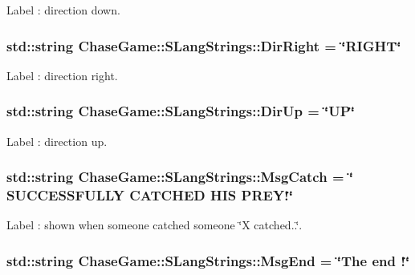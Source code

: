 Label \-: direction down. 

\hypertarget{struct_chase_game_1_1_s_lang_strings_a72eca1e0efc7ab4c6900c4f75322f0dc}{
\subsubsection[{Dir\-Right}]{\setlength{\rightskip}{0pt plus 5cm}std\-::string Chase\-Game\-::\-S\-Lang\-Strings\-::\-Dir\-Right = \char`\"{}R\-I\-G\-H\-T\char`\"{}}}\label{struct_chase_game_1_1_s_lang_strings_a72eca1e0efc7ab4c6900c4f75322f0dc}


Label \-: direction right. 

\hypertarget{struct_chase_game_1_1_s_lang_strings_adf4565dfe8e7ea901505441091d06b0c}{
\subsubsection[{Dir\-Up}]{\setlength{\rightskip}{0pt plus 5cm}std\-::string Chase\-Game\-::\-S\-Lang\-Strings\-::\-Dir\-Up = \char`\"{}U\-P\char`\"{}}}\label{struct_chase_game_1_1_s_lang_strings_adf4565dfe8e7ea901505441091d06b0c}


Label \-: direction up. 

\hypertarget{struct_chase_game_1_1_s_lang_strings_a5d6864e670cfe0b90ad02635a38035f4}{
\subsubsection[{Msg\-Catch}]{\setlength{\rightskip}{0pt plus 5cm}std\-::string Chase\-Game\-::\-S\-Lang\-Strings\-::\-Msg\-Catch = \char`\"{} S\-U\-C\-C\-E\-S\-S\-F\-U\-L\-L\-Y C\-A\-T\-C\-H\-E\-D H\-I\-S P\-R\-E\-Y!\char`\"{}}}\label{struct_chase_game_1_1_s_lang_strings_a5d6864e670cfe0b90ad02635a38035f4}


Label \-: shown when someone catched someone \char`\"{}\-X catched..\char`\"{}. 

\hypertarget{struct_chase_game_1_1_s_lang_strings_a257add6b60a691261480e9b1739564e1}{
\subsubsection[{Msg\-End}]{\setlength{\rightskip}{0pt plus 5cm}std\-::string Chase\-Game\-::\-S\-Lang\-Strings\-::\-Msg\-End = \char`\"{}The end !\char`\"{}}}\label{struct_chase_game_1_1_s_lang_strings_a257add6b60a691261480e9b1739564e1}


